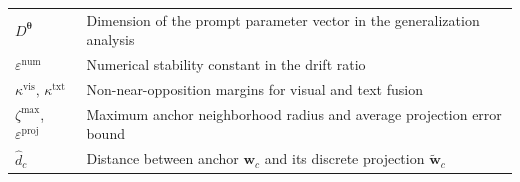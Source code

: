 \documentclass{article}
\theoremstyle{plain}
\theoremstyle{definition}
\theoremstyle{remark}
\begin{document}
\begin{table}[h]
{\begin{tabular}{ll}
				$D^{\boldsymbol{\theta}}$ & Dimension of the prompt parameter vector in the generalization analysis \\
				$\varepsilon^{\mathrm{num}}$ & Numerical stability constant in the drift ratio \\
				$\kappa^{\mathrm{vis}},\,\kappa^{\mathrm{txt}}$ & Non-near-opposition margins for visual and text fusion \\
				$\zeta^{\max}$, $\varepsilon^{\mathrm{proj}}$ & Maximum anchor neighborhood radius and average projection error bound \\
				$\hat d_c$ & Distance between anchor $\mathbf{w}_{c}$ and its discrete projection $\tilde{\mathbf{w}}_{c}$ \\
				\bottomrule
			\end{tabular}
		}
	\end{table}
	\makeatletter
	\setlength{\@fptop}{0pt}
	\makeatother
\end{document}

